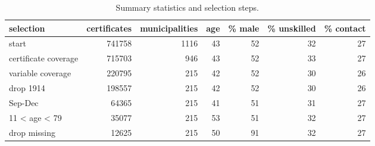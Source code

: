 \begin{table}

\caption{\label{tab:sumselect}Summary statistics and selection steps.}
\centering
\begin{tabular}[t]{l|r|r|r|r|r|r}
\hline
selection & certificates & municipalities & age & \% male & \% unskilled & \% contact\\
\hline
start & 741758 & 1116 & 43 & 52 & 32 & 27\\
\hline
certificate coverage & 715703 & 946 & 43 & 52 & 33 & 27\\
\hline
variable coverage & 220795 & 215 & 42 & 52 & 30 & 26\\
\hline
drop 1914 & 198557 & 215 & 42 & 52 & 30 & 26\\
\hline
Sep-Dec & 64365 & 215 & 41 & 51 & 31 & 27\\
\hline
11 < age < 79 & 35077 & 215 & 53 & 51 & 32 & 27\\
\hline
drop missing & 12625 & 215 & 50 & 91 & 32 & 27\\
\hline
\end{tabular}
\end{table}
